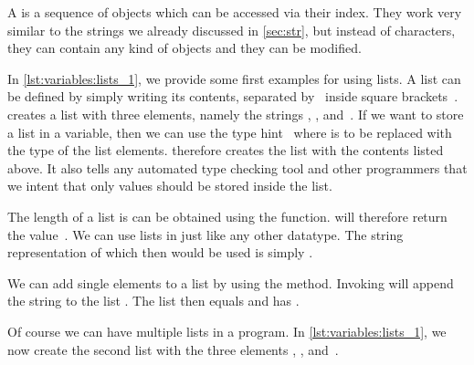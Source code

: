 %
%
%
%
%
%
A  is a sequence of objects which can be accessed via their index.
They work very similar to the strings we already discussed in \cref{sec:str}, but instead of characters, they can contain any kind of objects and they can be modified.

In \cref{lst:variables:lists_1}, we provide some first examples for using lists.
A list can be defined by simply writing its contents, separated by~\pythonilIdx{,} inside square brackets~\pythonilIdx{[...]}.
 creates a list with three elements, namely the strings , , and~.
If we want to store a list in a variable, then we can use the type hint~ where  is to be replaced with the type of the list elements.
 therefore creates the list  with the contents listed above.
It also tells any automated type checking tool and other programmers that we intent that only  values should be stored inside the list.

The length of a list is can be obtained using the  function.
 will therefore return the value~.
We can use lists in  just like any other datatype.
The string representation of  which then would be used is simply .%
%
\begin{sloppypar}%
We can add single elements to a list by using the  method.
Invoking  will append the string  to the list .
The list then equals  and has .%
\end{sloppypar}%
%
Of course we can have multiple lists in a program.
In \cref{lst:variables:lists_1}, we now create the second list  with the three elements , , and~.

